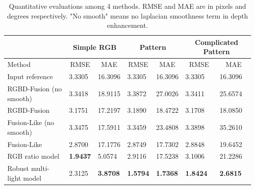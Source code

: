 \begin{table}[!ht]
\caption{Quantitative evaluations among 4 methods. RMSE and MAE are in pixels and degrees respectively. "No smooth" means no laplacian smoothness term in depth enhancement.}
\vspace{1em}
\label{tab:comp_syn_eval}
\centering
\begin{tabular}{lllllll}
                                       & \multicolumn{2}{c}{Simple RGB}                     & \multicolumn{2}{c}{Pattern}                        & \multicolumn{2}{c}{Complicated Pattern}            \\\hline
Method                                 & \multicolumn{1}{c}{RMSE} & \multicolumn{1}{c}{MAE} & \multicolumn{1}{c}{RMSE} & \multicolumn{1}{c}{MAE} & \multicolumn{1}{c}{RMSE} & \multicolumn{1}{c}{MAE} \\\hline\hline
Input reference                              & 3.3305                   & 16.3096                 & 3.3305                   & 16.3096                 & 3.3305                   & 16.3096                 \\
RGBD-Fusion\cite{or2015rgbd} (no smooth)                       & 3.3418                   & 18.9115                 & 3.3872                   & 27.0026                 & 3.3411                   & 25.6574  		\\
RGBD-Fusion\cite{or2015rgbd} & 3.1751                   & 17.2197                 & 3.1890                   & 18.4722                 & 3.1708                   & 18.0850                 \\ 
Fusion-Like (no smooth)                  & 3.3475                   & 17.5911                 & 3.3459                   & 23.4808                 & 3.3898                   & 35.2610                 \\
Fusion-Like                        & 2.8700                   & 17.1776                 & 2.8749                   & 17.7302                 & 2.8848                   & 19.6452                 \\
RGB ratio model                        & \textbf{1.9437}          & 5.0574         & 2.9116                   & 17.5238                 & 3.1006                   & 21.2286                 \\
Robust multi-light model               & 2.3125                   & \textbf{3.8708}                  & \textbf{1.5794}          & \textbf{1.7368}         & \textbf{1.8424}          & \textbf{2.6815}  \\\hline      
\end{tabular}
\end{table}


